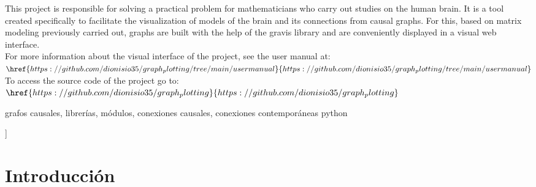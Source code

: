 \documentclass[a4paper,10pt,twocolumn]{article}
\begin{document}
\begin{enabstract}

This project is responsible for solving a practical problem for mathematicians who carry out studies on the human brain. It is a tool created specifically to facilitate the visualization of models of the brain and its connections from causal graphs. For this, based on matrix modeling previously carried out, graphs are built with the help of the gravis library and are conveniently displayed in a visual web interface.
\\
For more information about the visual interface of the project, see the user manual at: $\href{https://github.com/dionisio35/graph_plotting/tree/main/user manual}{https://github.com/dionisio35/graph_plotting/tree/main/user manual}$\\
To access the source code of the project go to:  $\href{https://github.com/dionisio35/graph_plotting}{https://github.com/dionisio35/graph_plotting}$
\end{enabstract}

\begin{keywords}
	grafos causales,
	librerías,
	módulos,
	conexiones causales,
	conexiones contemporáneas
	python
\end{keywords}



\vspace{1.8cm}
]



\section*{Introducción}\label{sec:intro}
\end{document}
